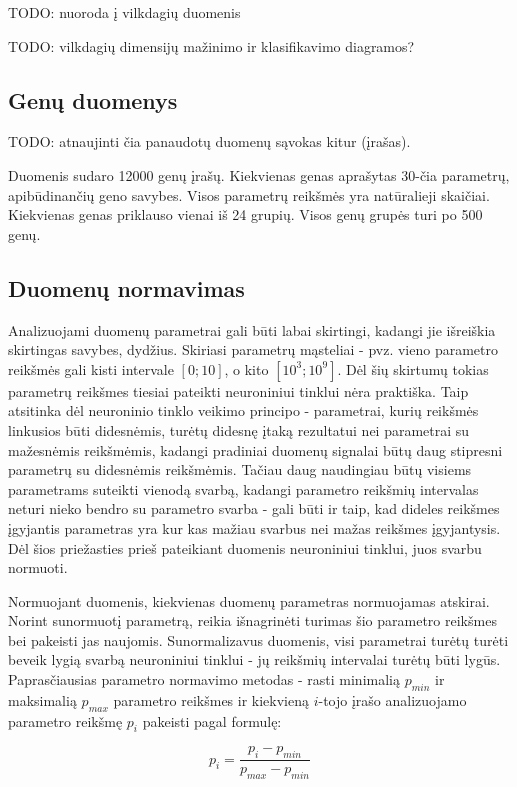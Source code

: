 \documentclass{VUMIFPSbakalaurinis}
\newcommand{\TODO}[1]{
\colorbox{todo-background-color}{TODO: #1}
}
\begin{document}
\TODO{nuoroda į vilkdagių duomenis}

\TODO{vilkdagių dimensijų mažinimo ir klasifikavimo diagramos?}

\subsection{Genų duomenys}

\TODO{atnaujinti čia panaudotų duomenų sąvokas kitur (įrašas).}

Duomenis sudaro 12000 genų įrašų.
Kiekvienas genas aprašytas 30-čia parametrų, apibūdinančių geno savybes.
Visos parametrų reikšmės yra natūralieji skaičiai.
Kiekvienas genas priklauso vienai iš 24 grupių.
Visos genų grupės turi po 500 genų.


\subsection{Duomenų normavimas}

Analizuojami duomenų parametrai gali būti labai skirtingi, kadangi jie išreiškia skirtingas savybes, dydžius.
Skiriasi parametrų mąsteliai - pvz. vieno parametro reikšmės gali kisti intervale $[0; 10]$, o kito $[10^3; 10^9]$.
Dėl šių skirtumų tokias parametrų reikšmes tiesiai pateikti neuroniniui tinklui nėra praktiška.
Taip atsitinka dėl neuroninio tinklo veikimo principo - parametrai, kurių reikšmės linkusios būti didesnėmis, turėtų didesnę įtaką rezultatui nei parametrai su mažesnėmis reikšmėmis, kadangi pradiniai duomenų signalai būtų daug stipresni parametrų su didesnėmis reikšmėmis.
Tačiau daug naudingiau būtų visiems parametrams suteikti vienodą svarbą, kadangi parametro reikšmių intervalas neturi nieko bendro su parametro svarba - gali būti ir taip, kad dideles reikšmes įgyjantis parametras yra kur kas mažiau svarbus nei mažas reikšmes įgyjantysis.
Dėl šios priežasties prieš pateikiant duomenis neuroniniui tinklui, juos svarbu normuoti.

Normuojant duomenis, kiekvienas duomenų parametras normuojamas atskirai.
Norint sunormuotį parametrą, reikia išnagrinėti turimas šio parametro reikšmes bei pakeisti jas naujomis.
Sunormalizavus duomenis, visi parametrai turėtų turėti beveik lygią svarbą neuroniniui tinklui - jų reikšmių intervalai turėtų būti lygūs.
Paprasčiausias parametro normavimo metodas - rasti minimalią $p_{min}$ ir maksimalią $p_{max}$ parametro reikšmes ir kiekvieną $i$-tojo įrašo analizuojamo parametro reikšmę $p_i$ pakeisti pagal formulę:

\begin{equation}
p_i = \frac{p_i - p_{min}}{p_{max} - p_{min}}
\end{equation}
\end{document}
